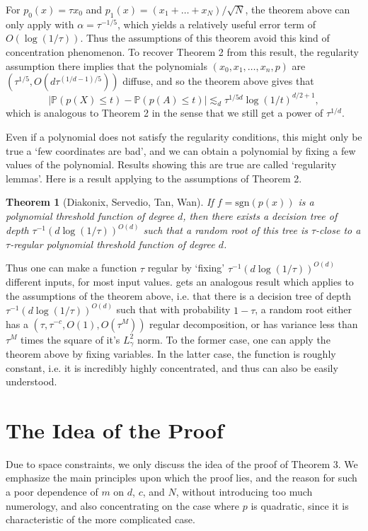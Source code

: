 \documentclass{article}
\theoremstyle{plain}
\newtheorem{theorem}{Theorem}
\theoremstyle{definition}
\begin{document}
For $p_0(x) = \tau x_0$ and $p_1(x) = (x_1 + \dots + x_N) / \sqrt{N}$, the theorem above can only apply with $\alpha = \tau^{-1/5}$, which yields a relatively useful error term of $O(\log(1/\tau))$. Thus the assumptions of this theorem avoid this kind of concentration phenomenon. To recover Theorem 2 from this result, the regularity assumption there implies that the polynomials $(x_0,x_1,\dots,x_n,p)$ are $(\tau^{1/5},O(d \tau^{(1/d-1)/5}))$ diffuse, and so the theorem above gives that
%
\[ |\mathbb{P}(p(X) \leq t) - \mathbb{P}(p(A) \leq t)| \lesssim_d \tau^{1/5d} \log(1/t)^{d/2+1}, \]
%
which is analogous to Theorem 2 in the sense that we still get a power of $\tau^{1/d}$.

Even if a polynomial does not satisfy the regularity conditions, this might only be true a `few coordinates are bad', and we can obtain a polynomial by fixing a few values of the polynomial. Results showing this are true are called `regularity lemmas'. Here is a result applying to the assumptions of Theorem 2.

\begin{theorem} [Diakonix, Servedio, Tan, Wan] If $f = \text{sgn}(p(x))$ is a polynomial threshold function of degree $d$, then there exists a decision tree of depth $\tau^{-1} (d \log(1/\tau))^{O(d)}$ such that a random root of this tree is $\tau$-close to a $\tau$-regular polynomial threshold function of degree $d$.
\end{theorem}

Thus one can make a function $\tau$ regular by `fixing' $\tau^{-1} (d \log(1/\tau))^{O(d)}$ different inputs, for most input values. \cite{Kane} gets an analogous result which applies to the assumptions of the theorem above, i.e. that there is a decision tree of depth $\tau^{-1} (d \log (1/\tau))^{O(d)}$ such that with probability $1 - \tau$, a random root either has a $(\tau,\tau^{-c},O(1),O(\tau^M))$ regular decomposition, or has variance less than $\tau^M$ times the square of it's $L^2_\gamma$ norm. To the former case, one can apply the theorem above by fixing variables. In the latter case, the function is roughly constant, i.e. it is incredibly highly concentrated, and thus can also be easily understood.

\section{The Idea of the Proof}

Due to space constraints, we only discuss the idea of the proof of Theorem 3. We emphasize the main principles upon which the proof lies, and the reason for such a poor dependence of $m$ on $d$, $c$, and $N$, without introducing too much numerology, and also concentrating on the case where $p$ is quadratic, since it is characteristic of the more complicated case.
\end{document}
